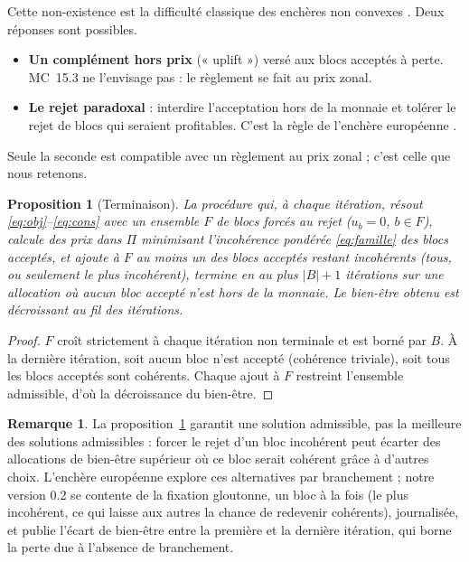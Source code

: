 \documentclass[a4paper,12pt]{article}
\newtheorem{proposition}{Proposition}
\theoremstyle{definition}
\newtheorem{remark}{Remarque}
\newcommand{\MC}[1]{MC~#1}
\begin{document}
Cette non-existence est la difficulté classique des enchères non convexes \citep{oneill2005,meeus2009,martin2014}. Deux réponses sont possibles.

\begin{itemize}
\item \textbf{Un complément hors prix} (« uplift ») versé aux blocs acceptés à perte. \MC{15.3} ne l'envisage pas : le règlement se fait au prix zonal.
\item \textbf{Le rejet paradoxal} : interdire l'acceptation hors de la monnaie et tolérer le rejet de blocs qui seraient profitables. C'est la règle de l'enchère européenne \citep{euphemia2025}.
\end{itemize}

Seule la seconde est compatible avec un règlement au prix zonal ; c'est celle que nous retenons.

\begin{proposition}[Terminaison]\label{prop:terminaison}
La procédure qui, à chaque itération, résout \eqref{eq:obj}--\eqref{eq:cons} avec un ensemble $F$ de blocs forcés au rejet ($u_b=0$, $b\in F$), calcule des prix dans $\Pi$ minimisant l'incohérence pondérée \eqref{eq:famille} des blocs acceptés, et ajoute à $F$ au moins un des blocs acceptés restant incohérents (tous, ou seulement le plus incohérent), termine en au plus $|B|+1$ itérations sur une allocation où aucun bloc accepté n'est hors de la monnaie. Le bien-être obtenu est décroissant au fil des itérations.
\end{proposition}
\begin{proof}
$F$ croît strictement à chaque itération non terminale et est borné par $B$. À la dernière itération, soit aucun bloc n'est accepté (cohérence triviale), soit tous les blocs acceptés sont cohérents. Chaque ajout à $F$ restreint l'ensemble admissible, d'où la décroissance du bien-être.
\end{proof}

\begin{remark}
La proposition~\ref{prop:terminaison} garantit une solution admissible, pas la meilleure des solutions admissibles : forcer le rejet d'un bloc incohérent peut écarter des allocations de bien-être supérieur où ce bloc serait cohérent grâce à d'autres choix. L'enchère européenne explore ces alternatives par branchement \citep{madani2015} ; notre version 0.2 se contente de la fixation gloutonne, un bloc à la fois (le plus incohérent, ce qui laisse aux autres la chance de redevenir cohérents), journalisée, et publie l'écart de bien-être entre la première et la dernière itération, qui borne la perte due à l'absence de branchement.
\end{remark}
\end{document}
